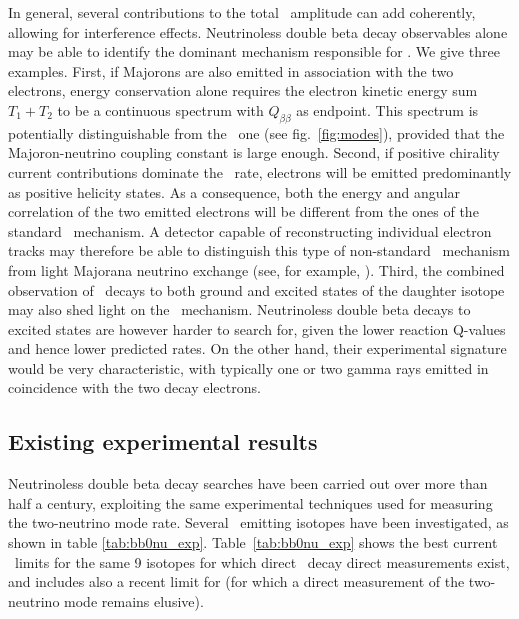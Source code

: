 In general, several contributions to the total \bbonu\ amplitude can add coherently, allowing for interference effects. Neutrinoless double beta decay observables alone may be able to identify the dominant mechanism responsible for \bbonu. We give three examples. First, if Majorons are also emitted in association with the two electrons, energy conservation alone requires the electron kinetic energy sum $T_1+T_2$ to be a continuous spectrum with $Q_{\beta\beta}$ as endpoint. This spectrum is potentially distinguishable from the \bbtnu\ one (see fig.~\ref{fig:modes}), provided that the Majoron-neutrino coupling constant is large enough. Second, if positive chirality current contributions dominate the \bbonu\ rate, electrons will be emitted predominantly as positive helicity states. As a consequence, both the energy and angular correlation of the two emitted electrons will be different from the ones of the standard \bbonu\ mechanism. A detector capable of reconstructing individual electron tracks may therefore be able to distinguish this type of non-standard \bbonu\ mechanism from light Majorana neutrino exchange (see, for example, \cite{SuperNEMO:2010wnd}). Third, the combined observation of \bbonu\ decays to both ground and excited states of the daughter isotope may also shed light on the \bbonu\ mechanism. Neutrinoless double beta decays to excited states are however harder to search for, given the lower reaction Q-values and hence lower predicted rates. On the other hand, their experimental signature would be very characteristic, with typically one or two gamma rays emitted in coincidence with the two decay electrons. 
%

\subsection{Existing experimental results} \label{subsec:bb0nu_expstatus}
Neutrinoless double beta decay searches have been carried out over more than half a century, exploiting the same experimental techniques used for measuring the two-neutrino mode rate. Several \bb\ emitting isotopes have been investigated, as shown in table \ref{tab:bb0nu_exp}. Table~\ref{tab:bb0nu_exp} shows the best current \bbonu\ limits for the same 9 isotopes for which direct \bbtnu\ decay direct measurements exist, and includes also a recent limit for   (for which a direct measurement of the two-neutrino mode remains elusive).

